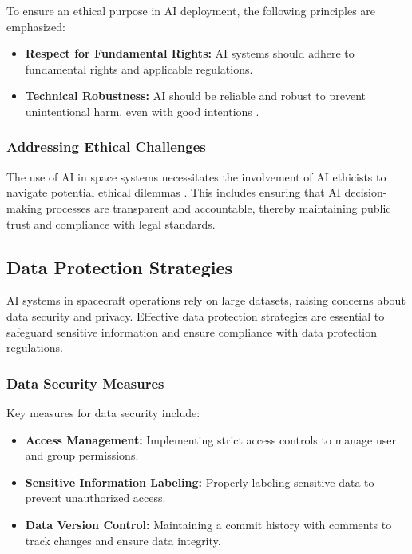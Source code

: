 \documentclass[a4paper, 11pt]{article}
\begin{document}
To ensure an ethical purpose in AI deployment, the following principles are emphasized:
\begin{itemize}
    \item \textbf{Respect for Fundamental Rights:} AI systems should adhere to fundamental rights and applicable regulations.
    \item \textbf{Technical Robustness:} AI should be reliable and robust to prevent unintentional harm, even with good intentions \cite{ai_hleg_guidelines}.
\end{itemize}

\subsubsection{Addressing Ethical Challenges}

The use of AI in space systems necessitates the involvement of AI ethicists to navigate potential ethical dilemmas \cite{pavaloiu_ethical_ai}. This includes ensuring that AI decision-making processes are transparent and accountable, thereby maintaining public trust and compliance with legal standards.

\subsection{Data Protection Strategies}

AI systems in spacecraft operations rely on large datasets, raising concerns about data security and privacy. Effective data protection strategies are essential to safeguard sensitive information and ensure compliance with data protection regulations.

\subsubsection{Data Security Measures}

Key measures for data security include:
\begin{itemize}
    \item \textbf{Access Management:} Implementing strict access controls to manage user and group permissions.
    \item \textbf{Sensitive Information Labeling:} Properly labeling sensitive data to prevent unauthorized access.
    \item \textbf{Data Version Control:} Maintaining a commit history with comments to track changes and ensure data integrity.
\end{itemize}
\end{document}
